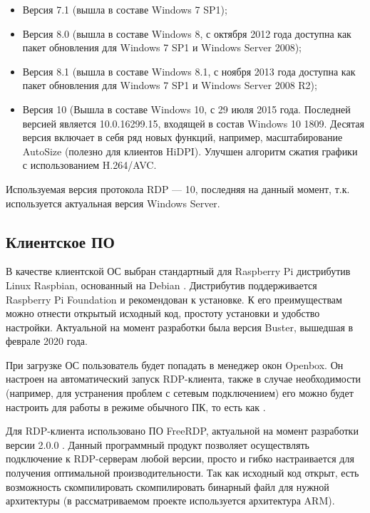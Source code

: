 \begin{itemize}
    \item Версия 7.1 (вышла в составе Windows 7 SP1);
    \item Версия 8.0 (вышла в составе Windows 8, с октября 2012 года доступна как пакет
        обновления для Windows 7 SP1 и Windows Server 2008);
    \item Версия 8.1 (вышла в составе Windows 8.1, с ноября 2013 года доступна как пакет
        обновления для Windows 7 SP1 и Windows Server 2008 R2);
    \item Версия 10 (Вышла в составе Windows 10, с 29 июля 2015 года. Последней версией
        является 10.0.16299.15, входящей в состав Windows 10 1809. Десятая версия
        включает в себя ряд новых функций, например, масштабирование AutoSize (полезно
        для клиентов HiDPI). Улучшен алгоритм сжатия графики с использованием H.264/AVC.
\end{itemize}

Используемая версия протокола RDP — 10, последняя на данный момент, т.к. используется
актуальная версия Windows Server.

\subsection{Клиентское ПО}

В качестве клиентской ОС выбран стандартный для Raspberry Pi дистрибутив Linux Raspbian,
основанный на Debian \cite{ref:raspbian}.
Дистрибутив поддерживается Raspberry Pi Foundation и рекомендован к установке.
К его преимуществам можно отнести открытый исходный код, простоту установки и удобство 
настройки. 
Актуальной на момент разработки была версия Buster, вышедшая в феврале 2020 года.

При загрузке ОС пользователь будет попадать в менеджер окон Openbox. Он настроен на
автоматический запуск RDP-клиента, также в случае необходимости (например, для
устранения проблем с сетевым подключением) его можно будет настроить для работы в режиме
обычного ПК, то есть как .

Для RDP-клиента использовано ПО FreeRDP, актуальной на момент разработки версии
2.0.0 \cite{ref:freerdp}. Данный программный продукт позволяет осуществлять подключение
к RDP-серверам любой версии, просто и гибко настраивается для получения оптимальной
производительности.  Так как исходный код открыт, есть возможность скомпилировать
скомпилировать бинарный файл для нужной архитектуры (в рассматриваемом проекте
используется архитектура ARM).

